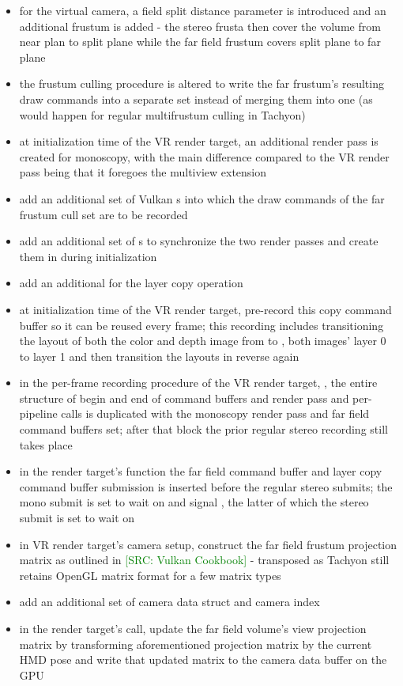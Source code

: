 \begin{itemize}
\item for the virtual camera, a field split distance parameter is introduced and an additional frustum is added - the stereo frusta then cover the volume from near plan to split plane while the far field frustum covers split plane to far plane
\item the frustum culling procedure is altered to write the far frustum's resulting draw commands into a separate set instead of merging them into one (as would happen for regular multifrustum culling in Tachyon)
\item at initialization time of the VR render target, an additional render pass is created for monoscopy, with the main difference compared to the VR render pass being that it foregoes the multiview extension
\item add an additional set of Vulkan s into which the draw commands of the far frustum cull set are to be recorded
\item add an additional set of s to synchronize the two render passes and create them in  during initialization
\item add an additional  for the layer copy operation
\item at initialization time of the VR render target, pre-record this copy command buffer so it can be reused every frame; this recording includes transitioning the layout of both the color and depth image from  to ,  both images' layer 0 to layer 1 and then transition the layouts in reverse again
\item in the per-frame recording procedure of the VR render target, , the entire structure of begin and end of command buffers and render pass and per-pipeline  calls is duplicated with the monoscopy render pass and far field command buffers set; after that block the prior regular stereo recording still takes place
\item in the render target's  function the far field command buffer and layer copy command buffer submission is inserted before the regular stereo submits; the mono submit is set to wait on  and signal , the latter of which the stereo submit is set to wait on
\item in VR render target's camera setup, construct the far field frustum projection matrix as outlined in \textcolor{green}{[SRC: Vulkan Cookbook]} - transposed as Tachyon still retains OpenGL matrix format for a few matrix types
\item add an additional set of camera data struct and camera index
\item in the render target's  call, update the far field volume's view projection matrix by transforming aforementioned projection matrix by the current HMD pose and write that updated matrix to the camera data buffer on the GPU
\end{itemize}
